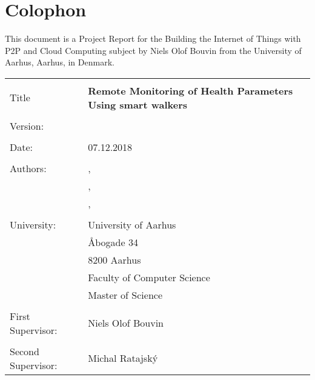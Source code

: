 \pagestyle{empty}

\hfill

\vfill


\section*{Colophon}
This document is a Project Report for the Building the Internet of Things with P2P and Cloud Computing subject by Niels Olof Bouvin from the University of Aarhus, Aarhus, in Denmark. 

\begin{table}[h]
	\begin{tabular}{ll}
		\textbf{} &  \\
		Title & \textbf{Remote Monitoring of Health Parameters Using smart walkers} \\
		&\\
		Version: & \noindent\finalVersionString\\
		&\\
		Date: & 07.12.2018 \\
		&\\
		Authors: & \myNameP, \myStudentIdP \\
		& \myNameH, \myStudentIdH \\
		& \myNameT, \myStudentIdT \\
		&\\
		University: & University of Aarhus \\
		& Åbogade 34\\
		& 8200 Aarhus\\
		& Faculty of Computer Science \\
		& Master of Science\\
		&\\
		First Supervisor: & Niels Olof Bouvin \\
		&\\
		Second Supervisor: & Michal Ratajský \\
		
	\end{tabular}\\
\end{table}
 
\bigskip


